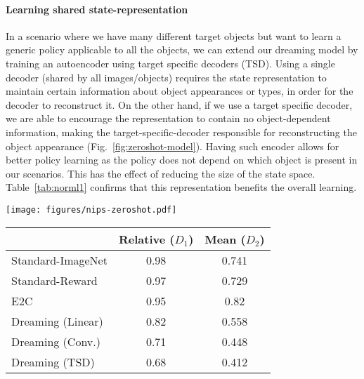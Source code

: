 \documentclass[letterpaper, 10 pt, conference]{ieeeconf}
\begin{document}
\paragraph{Learning shared state-representation} 
In a scenario where we have many different target objects but want to learn a generic policy applicable to all the objects, we can extend our dreaming model by training an autoencoder using target specific decoders (TSD).
Using a single decoder (shared by all images/objects) requires the state representation to maintain certain information about object appearances or types, in order for the decoder to reconstruct it. On the other hand, if we use a target specific decoder, we are able to encourage the representation to contain no object-dependent information, making the target-specific-decoder responsible for reconstructing the object appearance (Fig.~\ref{fig:zeroshot-model}). Having such encoder allows for better policy learning as the policy does not depend on which object is present in our scenarios. This has the effect of reducing the size of the state space. Table~\ref{tab:norml1} confirms that this representation benefits the overall learning.



\begin{figure*}
    \centering
    \begin{minipage}{0.5\textwidth}
    \centering
      \texttt{[image: figures/nips-zeroshot.pdf]}
      \caption{Shared encoder with target specific decoders (TSD). This architecture forces the learned state representation to contain no information specific to the visible target.}
      \label{fig:zeroshot-model}
    \end{minipage}
    \hfill
    \begin{minipage}{0.48\textwidth}
      \label{tab:norml1}
      \centering
      \small
      \begin{tabular}{lcc}
        \toprule
             &  Relative ($D_1$)    & Mean ($D_2$) \\
        \midrule
         Standard-ImageNet &	0.98 &	0.741\\
         Standard-Reward &	0.97 &	0.729\\
         E2C \cite{watter2015embed} & 0.95 & 0.82\\
         Dreaming (Linear) &	0.82 &	0.558\\
         Dreaming (Conv.) &	0.71 &	0.448\\
         Dreaming (TSD)         & 0.68  & 0.412\\
        \bottomrule
       \end{tabular}
    \end{minipage}
\end{figure*}
\end{document}
